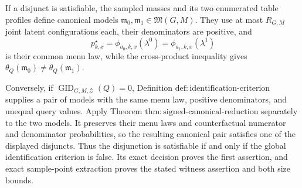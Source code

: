 If a disjunct is satisfiable, the sampled masses and its two enumerated table profiles define canonical models \(\mathfrak m_0,\mathfrak m_1\in\mathfrak M(G,M)\).  They use at most \(R_{G,M}\) joint latent configurations each, their denominators are positive, and
\[
 p^\star_{k,x}
 =\phi_{a_0,k,x}(\lambda^0)
 =\phi_{a_1,k,x}(\lambda^1)
\]
is their common menu law, while the cross-product inequality gives \(\theta_Q(\mathfrak m_0)\neq\theta_Q(\mathfrak m_1)\).

Conversely, if \(\operatorname{GID}_{G,M,\mathcal Z}(Q)=0\), Definition \(\mathrm{def:identification\text{-}criterion}\) supplies a pair of models with the same menu law, positive denominators, and unequal query values.  Apply Theorem \(\mathrm{thm:signed\text{-}canonical\text{-}reduction}\) separately to the two models.  It preserves their menu laws and counterfactual numerator and denominator probabilities, so the resulting canonical pair satisfies one of the displayed disjuncts.  Thus the disjunction is satisfiable if and only if the global identification criterion is false.  Its exact decision proves the first assertion, and exact sample-point extraction proves the stated witness assertion and both size bounds.